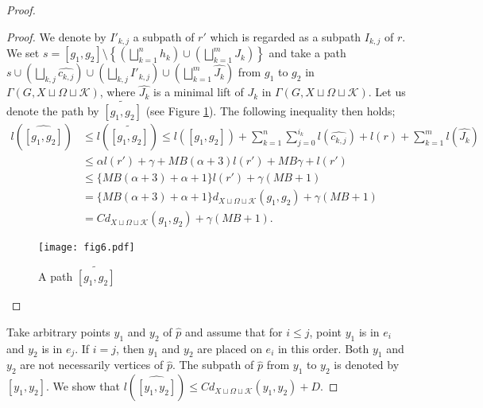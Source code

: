 \documentclass{amsart}
\theoremstyle{definition}
\begin{document}
\begin{proof}
\begin{proof}
We denote by $I'_{k, j}$ a subpath of $r'$ which is regarded as a subpath $I_{k, j}$ of $r$.
We set $s=[g_1,g_2]\setminus \left\{\left(\bigsqcup_{k=1}^n h_k\right)\cup \left( \bigsqcup_{k=1}^m J_k \right)\right\}$ and take a path $s \cup \left(\bigsqcup_{k,j} \widehat{c_{k,j}}\right) \cup \left(\bigsqcup_{k,j} {I'_{k,j}}\right)\cup \left(\bigsqcup_{k=1}^m \widehat{J_k}\right)$ from $g_1$ to $g_2$ in $\Gamma(G,X\sqcup\Omega\sqcup{\mathcal K})$, where $\widehat{J_k}$ is a minimal lift of $J_k$ in $\Gamma(G,X\sqcup \Omega\sqcup {\mathcal K})$. 
Let us denote the path by $\widetilde{[g_1,g_2]}$ (see Figure \ref{fig6}). 
The following inequality then holds;
\begin{equation*}
\begin{split}
l(\widehat{[g_1,g_2]})&\le l(\widetilde{[g_1,g_2]})\le l([g_1,g_2])+\sum_{k=1}^n \sum_{j=0}^{i_k}l(\widehat{c_{k,j}})+l(r)+\sum_{k=1}^m l(\widehat{J_k})\\
&\le \alpha l(r')+\gamma+MB(\alpha+3)l(r')+MB\gamma+l(r') \\
&\le\{MB(\alpha+3)+\alpha+1\}l(r')+\gamma(MB+1)\\
&=\{MB(\alpha+3)+\alpha+1\}d_{X\sqcup \Omega\sqcup{\mathcal K}}(g_1,g_2)+\gamma(MB+1)\\
&=Cd_{X\sqcup\Omega\sqcup{\mathcal K}}(g_1,g_2)+\gamma(MB+1).
\end{split}
\end{equation*}
\begin{figure}[top]
\begin{center}
\texttt{[image: fig6.pdf]}
\end{center}
\caption{A path $\widetilde{[g_1,g_2]}$}
\label{fig6}
\end{figure}
\end{proof}

Take arbitrary points $y_1$ and $y_2$ of $\widehat{p}$ and assume that for $i \leq j$, point $y_1$ is in $e_i$ and $y_2$ is in $e_j$. 
If $i=j$, then $y_1$ and $y_2$ are placed on $e_i$ in this order. 
Both $y_1$ and $y_2$ are not necessarily vertices of $\widehat p$. 
The subpath of $\widehat{p}$ from $y_1$ to $y_2$ is denoted by $\widehat{[y_1,y_2]}$. 
We show that $l(\widehat{[y_1,y_2]})\leq Cd_{X\sqcup \Omega \sqcup {\mathcal K}}(y_1,y_2) + D$. 


\end{proof}
\end{document}

